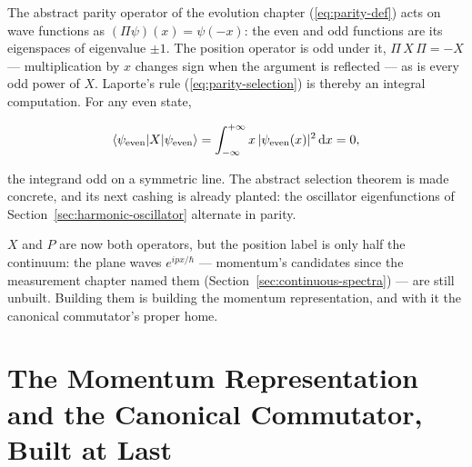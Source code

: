 The abstract parity operator of the evolution chapter (\eqref{eq:parity-def}) acts on wave functions as $(\Pi\psi)(x) = \psi(-x)$: the even and odd functions are its eigenspaces of eigenvalue $\pm 1$. The position operator is odd under it, $\Pi\,X\,\Pi = -X$ --- multiplication by $x$ changes sign when the argument is reflected --- as is every odd power of $X$. Laporte's rule (\eqref{eq:parity-selection}) is thereby an integral computation. For any even state,
\begin{linenomath}
    \begin{equation*}
        \braket{\psi_{\mathrm{even}}|X|\psi_{\mathrm{even}}} = \int_{-\infty}^{+\infty} x\,|\psi_{\mathrm{even}}(x)|^2\,\mathrm{d} x = 0,
    \end{equation*}
\end{linenomath}
the integrand odd on a symmetric line. The abstract selection theorem is made concrete, and its next cashing is already planted: the oscillator eigenfunctions of Section~\ref{sec:harmonic-oscillator} alternate in parity.

$X$ and $P$ are now both operators, but the position label is only half the continuum: the plane waves $e^{ipx/\hbar}$ --- momentum's candidates since the measurement chapter named them (Section~\ref{sec:continuous-spectra}) --- are still unbuilt. Building them is building the momentum representation, and with it the canonical commutator's proper home.

\section{The Momentum Representation and the Canonical Commutator, Built at Last}
\label{sec:momentum-representation}

